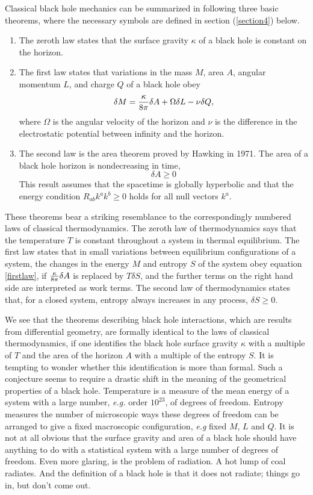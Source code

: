 \documentclass[12pt]{article}
\newcommand{\be}{\begin{equation}}
\newcommand{\ee}{\end{equation}}
\begin{document}
Classical black hole mechanics can be summarized in following three basic
theorems, where the
necessary symbols are defined in section (\ref{section4}) below.

\begin{enumerate}
\item The zeroth law states that the surface gravity $\kappa$ of a black hole is
constant on the horizon. 

\item The first law states that variations in
the mass $M$, area $A$, angular momentum $L$, and charge $Q$ of a black hole
obey \cite{bch,carter}
%
\be\label{firstlaw}\delta M ={\kappa \over 8\pi } \delta A +\Omega \delta L
-\nu \delta Q,\ee
%
where $\Omega$ is the angular velocity of the horizon and $\nu$
is the difference in the electrostatic potential between infinity and
the horizon.

\item The second law is
the area theorem \cite{area} proved by Hawking in 1971. The area of a black
hole horizon is nondecreasing in time,
%
\be\label{areath}\delta A \ge 0\ee
%
This result assumes that the spacetime is globally
hyperbolic and that the energy condition $R_{ab}k^a k^b \ge 0 $ holds for all
null vectors $k^a$.
\end{enumerate}

\noindent
These theorems bear a striking resemblance to the correspondingly numbered
laws of classical thermodynamics.  The zeroth law of thermodynamics says
that the temperature
$T$ is constant throughout a system in thermal equilibrium. The first law
states that in
small variations between equilibrium configurations of a system, the
changes in the energy $M$ and entropy $S$ of the system obey equation
\ref{firstlaw}, if
${\kappa \over 8\pi} \delta A$ is replaced by $T\delta S$, and the further
terms on the
right hand side are interpreted as work terms.  The second law of thermodynamics
states that, for a closed system, entropy always increases in any process,
$\delta S \ge 0$.

We see that the theorems describing black hole interactions, which are
results from
differential geometry, are formally identical to the laws of classical
thermodynamics, if one
identifies the black hole surface gravity $\kappa$ with a multiple of $T$ and the area of
the horizon $A$ with a multiple of the entropy $S$.   It is tempting to
wonder whether this
identification is more than formal.  Such a conjecture seems to require a
drastic
shift in the meaning of the geometrical properties of a black hole.
Temperature is a
measure of the mean energy of a  system with a large number, {\it e.g.}
order $10^{23}$, of
degrees of freedom. Entropy measures the number of microscopic ways these
degrees of
freedom can be arranged to give a fixed macroscopic configuration, {\it
e.g} fixed $M$, $L$
and $Q$. It is not at all obvious that the surface gravity and area of a
black hole should
have anything to do with a statistical system with a large number of degrees of
freedom.  Even more glaring, is the problem of radiation.  A hot lump of
coal radiates. And
the definition of a black hole is that it does not radiate; things go in,
but don't come out.
\end{document}
